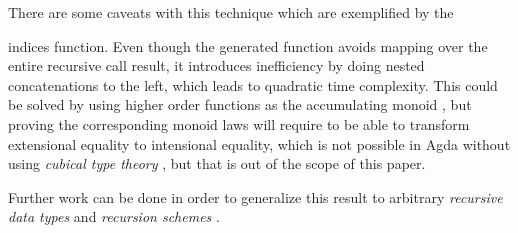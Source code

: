 \documentclass{cys}
\newcommand*{\SavedLstInline}{}
\DeclareRobustCommand*{\lstinline}{%
  \ifmmode
    \let\SavedBGroup\bgroup
    \def\bgroup{%
      \let\bgroup\SavedBGroup
      \hbox\bgroup
    }%
  \fi
  \SavedLstInline
  }
\begin{document}
There are some caveats with this technique which are exemplified by the
\lstinline{indices} function. Even though the generated function avoids mapping over the
entire recursive call result, it introduces inefficiency by doing nested concatenations
to the left, which leads to quadratic time complexity. This could be solved by using
higher order functions as the accumulating monoid \cite{hughes1986novel}, but proving the
corresponding monoid laws will require to be able to transform extensional equality to
intensional equality, which is not possible in Agda without using \emph{cubical type
theory} \cite{botta2021extensional,vezzosi2021cubical}, but that is out of the scope of
this paper.

Further work can be done in order to generalize this result to arbitrary \emph{recursive
data types} and \emph{recursion schemes} \cite{meijer1991functional}.

%
%

\small{


}
\normalsize


\begin{biography}[]{} %
\end{biography}
\end{document}

